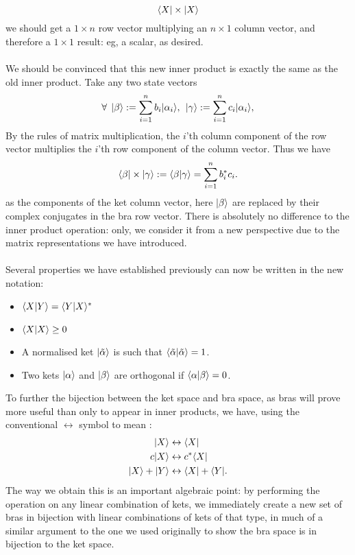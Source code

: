 $$
\langle X| \times |X\rangle
$$
we should get a $1\times n$ row vector multiplying an $n\times 1$ column vector, and therefore a $1\times 1$ result: eg, a scalar, as desired. 
\\\\
We should be convinced that this new inner product is exactly the same as the old inner product. Take any two state vectors
$$
\forall\:\:|\beta\rangle:=\sum_{i=1}^{n}b_{i}|\alpha_{i}\rangle, \:\: |\gamma\rangle:=\sum_{i=1}^{n}c_{i}|\alpha_{i}\rangle,
$$
By the rules of matrix multiplication, the  $i$'th column component of the row vector multiplies the $i$'th row component of the column vector. Thus we have
$$
\langle\beta|\times|\gamma\rangle:=\langle\beta|\gamma\rangle=\sum_{i=1}^{n}b^{\ast}_{i}c_{i}.
$$
as the components of the ket column vector, here $|\beta\rangle$ are replaced by their complex conjugates in the bra row vector. There is absolutely no difference to the inner product operation: only, we consider it from a new perspective due to the matrix representations we have introduced.
\\\\
Several properties we have established previously can now be written in the new notation:
\begin{itemize}
    \item $\langle X|Y\rangle=\langle Y|X\rangle^{\ast}$
    \item $\langle X|X\rangle\geq0$
    \item A normalised ket $|\tilde{\alpha}\rangle$ is such that $\langle\tilde{\alpha}|{\tilde{\alpha}}\rangle=1$.
    \item Two kets $|\alpha\rangle$ and $|\beta\rangle$ are orthogonal if $\langle\alpha|\beta\rangle=0$.
\end{itemize}
To further the bijection between the ket space and bra space, as bras will prove more useful than only to appear in inner products, we have, using the conventional $\leftrightarrow$ symbol to mean :
$$
\begin{aligned}
|X\rangle&\leftrightarrow\langle X|\\
c|X\rangle&\leftrightarrow c^{\ast}\langle X|\\
|X\rangle+|Y\rangle&\leftrightarrow \langle X|+\langle Y|.\\
\end{aligned}
$$
The way we obtain this is an important algebraic point: by performing the operation  on any linear combination of kets, we immediately create a new set of bras in bijection with linear combinations of kets of that type, in much of a similar argument to the one we used originally to show the bra space is in bijection to the ket space.
